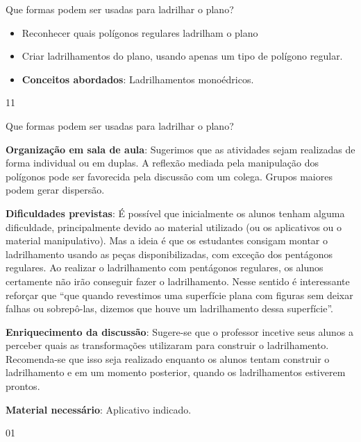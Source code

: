 \begin{objectives}{Que formas podem ser usadas para ladrilhar o plano?}
{
	\begin{itemize}
	\item Reconhecer quais polígonos regulares ladrilham o plano
	\item Criar ladrilhamentos do plano, usando apenas um tipo de polígono regular.
	\item \textbf{Conceitos abordados}: Ladrilhamentos monoédricos.
	\end{itemize}
}{1}{1}
\end{objectives}
\begin{sugestions}{Que formas podem ser usadas para ladrilhar o plano?}
{
	\textbf{Organização em sala de aula}: Sugerimos que as atividades sejam realizadas de forma individual ou em duplas. A reflexão mediada pela manipulação dos polígonos pode ser favorecida pela discussão com um colega. Grupos maiores podem gerar dispersão.

	\textbf{Dificuldades previstas}: É possível que inicialmente os alunos tenham alguma dificuldade, principalmente devido ao material utilizado (ou os aplicativos ou o material manipulativo). Mas a ideia é que os estudantes consigam montar o ladrilhamento usando as peças disponibilizadas, com exceção dos pentágonos regulares. Ao realizar o ladrilhamento com pentágonos regulares, os alunos certamente não irão conseguir fazer o ladrilhamento. Nesse sentido é interessante reforçar que “que quando revestimos uma superfície plana com figuras sem deixar falhas ou sobrepô-las, dizemos que houve um ladrilhamento dessa superfície”. 

	\textbf{Enriquecimento da discussão}: Sugere-se que o professor incetive seus alunos a perceber quais as transformações utilizaram para construir o ladrilhamento. Recomenda-se que isso seja realizado enquanto os alunos tentam construir o ladrilhamento e em um momento posterior, quando os ladrilhamentos estiverem prontos.

	\textbf{Material necessário}: Aplicativo indicado.
}{0}{1}
\end{sugestions}
